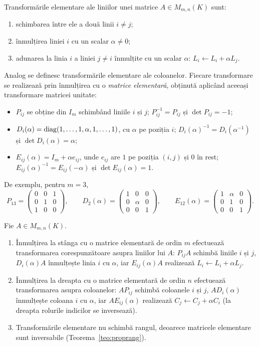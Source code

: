 Transformările elementare ale liniilor unei matrice $A\in M_{m,n}(K)$ sunt:
\begin{enumerate}
\item schimbarea între ele a două linii $i\neq j$;
\item înmulțirea liniei $i$ cu un scalar $\alpha\neq0$;
\item adunarea la linia $i$ a liniei $j\neq i$ înmulțite cu un scalar $\alpha$: $L_i\leftarrow L_i+\alpha L_j$.
\end{enumerate}
Analog se definesc transformările elementare ale coloanelor. Fiecare transformare se realizează prin înmulțirea cu o \emph{matrice elementară}, obținută aplicând aceeași transformare matricei unitate:
\begin{itemize}
\item $P_{ij}$ se obține din $I_m$ schimbând liniile $i$ și $j$; $P_{ij}^{-1}=P_{ij}$ și $\det P_{ij}=-1$;
\item $D_i(\alpha)=\operatorname{diag}(1,\dots,1,\alpha,1,\dots,1)$, cu $\alpha$ pe poziția $i$; $D_i(\alpha)^{-1}=D_i(\alpha^{-1})$ și $\det D_i(\alpha)=\alpha$;
\item $E_{ij}(\alpha)=I_m+\alpha e_{ij}$, unde $e_{ij}$ are $1$ pe poziția $(i,j)$ și $0$ în rest; $E_{ij}(\alpha)^{-1}=E_{ij}(-\alpha)$ și $\det E_{ij}(\alpha)=1$.
\end{itemize}
De exemplu, pentru $m=3$,
\[
P_{13}=\begin{pmatrix}0&0&1\\0&1&0\\1&0&0\end{pmatrix},\qquad
D_2(\alpha)=\begin{pmatrix}1&0&0\\0&\alpha&0\\0&0&1\end{pmatrix},\qquad
E_{12}(\alpha)=\begin{pmatrix}1&\alpha&0\\0&1&0\\0&0&1\end{pmatrix}.
\]

\begin{propozitie}\label{prop:elementare}
Fie $A\in M_{m,n}(K)$.
\begin{enumerate}
\item Înmulțirea la stânga cu o matrice elementară de ordin $m$ efectuează transformarea corespunzătoare asupra liniilor lui $A$: $P_{ij}A$ schimbă liniile $i$ și $j$, $D_i(\alpha)A$ înmulțește linia $i$ cu $\alpha$, iar $E_{ij}(\alpha)A$ realizează $L_i\leftarrow L_i+\alpha L_j$.
\item Înmulțirea la dreapta cu o matrice elementară de ordin $n$ efectuează transformarea asupra coloanelor: $AP_{ij}$ schimbă coloanele $i$ și $j$, $AD_i(\alpha)$ înmulțește coloana $i$ cu $\alpha$, iar $AE_{ij}(\alpha)$ realizează $C_j\leftarrow C_j+\alpha C_i$ (la dreapta rolurile indicilor se inversează).
\item Transformările elementare nu schimbă rangul, deoarece matricele elementare sunt inversabile (Teorema~\ref{teo:proprang}).
\end{enumerate}
\end{propozitie}

